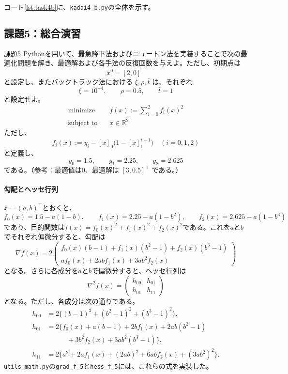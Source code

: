 \documentclass[a4j]{jarticle}
\begin{document}
\par\noindent
コード\ref{lst:task4b}に、\texttt{kadai4\_b.py}の全体を示す。
\par




\subsection{課題5：総合演習}
\label{sec:task5}
\begin{itembox}[l]{課題5}
Pythonを用いて、最急降下法およびニュートン法を実装することで次の最適化問題を解き、最適解および各手法の反復回数を与えよ。ただし、初期点は
\[
x^0=[2,0]^\top
\]
と設定し、またバックトラック法における $\xi,\rho,\bar t$ は、それぞれ
\[
\xi=10^{-4},\qquad\rho=0.5,\qquad\bar t=1
\]
と設定せよ。
\[
\begin{aligned}
\operatorname{minimize}\quad &f(x):=\sum_{i=0}^{2} f_i(x)^2\\
\operatorname{subject\ to}\quad &x\in\mathbb{R}^2
\end{aligned}
\]
ただし、
\[
f_i(x):=y_i-[x]_0\bigl(1-[x]_1^{i+1}\bigr)\quad(i=0,1,2)
\]
と定義し、
\[
y_0=1.5,\qquad y_1=2.25,\qquad y_2=2.625
\]
である。（参考：最適値は0、最適解は $[3,0.5]^\top$ である。）
\end{itembox}
\paragraph{勾配とヘッセ行列}
$x=(a,b)^\top$とおくと、
\[
  f_0(x)=1.5-a(1-b),\qquad
  f_1(x)=2.25-a(1-b^2),\qquad
  f_2(x)=2.625-a(1-b^3)
\]
であり、目的関数は$f(x)=f_0(x)^2+f_1(x)^2+f_2(x)^2$である。これを$a$と$b$でそれぞれ偏微分すると、勾配は
\[
  \nabla f(x)=2\begin{pmatrix}
    f_0(x)(b-1)+f_1(x)(b^2-1)+f_2(x)(b^3-1)\\
    af_0(x)+2abf_1(x)+3ab^2f_2(x)
  \end{pmatrix}
\]
となる。さらに各成分を$a$と$b$で偏微分すると、ヘッセ行列は
\[
  \nabla^2 f(x)=\begin{pmatrix}
    h_{00}&h_{01}\\
    h_{01}&h_{11}
  \end{pmatrix}
\]
となる。ただし、各成分は次の通りである。
\[
\begin{aligned}
  h_{00}&=2\bigl\{(b-1)^2+(b^2-1)^2+(b^3-1)^2\bigr\},\\
  h_{01}&=2\bigl\{f_0(x)+a(b-1)+2bf_1(x)+2ab(b^2-1)\\
    &\hspace{3em}+3b^2f_2(x)+3ab^2(b^3-1)\bigr\},\\
  h_{11}&=2\bigl\{a^2+2af_1(x)+(2ab)^2+6abf_2(x)+(3ab^2)^2\bigr\}.
\end{aligned}
\]
\texttt{utils\_math.py}の\texttt{grad\_f\_5}と\texttt{hess\_f\_5}には、これらの式を実装した。
\end{document}
